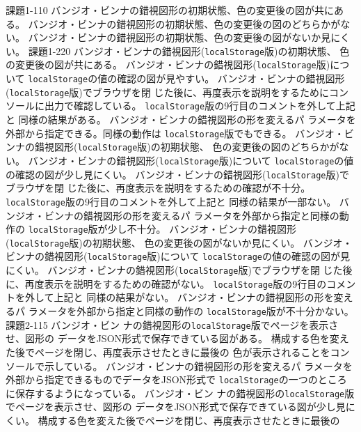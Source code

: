 \documentclass[a4j]{jreport}
\begin{document}
{
{課題1-1}{10}
{
  {バンジオ・ビンナの錯視図形の初期状態、色の変更後の図が共にある。}
}
{
  {バンジオ・ビンナの錯視図形の初期状態、色の変更後の図のどちらかがない。}
}
{
  {バンジオ・ビンナの錯視図形の初期状態、色の変更後の図がないか見にくい。}
}
{\ResultA}
{課題1-2}{20}
{
  {バンジオ・ビンナの錯視図形(\texttt{{localStorage}}版)の初期状態、
  色の変更後の図が共にある。}
  {バンジオ・ビンナの錯視図形(\texttt{localStorage}版)について
  \texttt{localStorage}の値の確認の図が見やすい。}
  {バンジオ・ビンナの錯視図形(\texttt{localStorage}版)でブラウザを閉
  じた後に、再度表示を説明をするためにコンソールに出力で確認している。}
	{\texttt{localStorage}版の9行目のコメントを外して上記と
				同様の結果がある。}
	{バンジオ・ビンナの錯視図形の形を変えるパ
				ラメータを外部から指定できる。同様の動作は
				\texttt{localStorage}版でもできる。}
}
{
  {バンジオ・ビンナの錯視図形(\texttt{{localStorage}}版)の初期状態、
  色の変更後の図のどちらかがない。}
  {バンジオ・ビンナの錯視図形(\texttt{localStorage}版)について
  \texttt{localStorage}の値の確認の図が少し見にくい。}
  {バンジオ・ビンナの錯視図形(\texttt{localStorage}版)でブラウザを閉
  じた後に、再度表示を説明をするための確認が不十分。}
	{\texttt{localStorage}版の9行目のコメントを外して上記と
				同様の結果が一部ない。}
	{バンジオ・ビンナの錯視図形の形を変えるパ
				ラメータを外部から指定と同様の動作の
				\texttt{localStorage}版が少し不十分。}
}
{
  {バンジオ・ビンナの錯視図形(\texttt{{localStorage}}版)の初期状態、
  色の変更後の図がないか見にくい。}
  {バンジオ・ビンナの錯視図形(\texttt{localStorage}版)について
  \texttt{localStorage}の値の確認の図が見にくい。}
  {バンジオ・ビンナの錯視図形(\texttt{localStorage}版)でブラウザを閉
  じた後に、再度表示を説明をするための確認がない。}
	{\texttt{localStorage}版の9行目のコメントを外して上記と
				同様の結果がない。}
	{バンジオ・ビンナの錯視図形の形を変えるパ
				ラメータを外部から指定と同様の動作の
				\texttt{localStorage}版が不十分かない。}
}
{\ResultA}
{課題2-1}{15}
{
	{バンジオ・ビン
				ナの錯視図形の\texttt{localStorage}版でページを表示させ、図形の
				データをJSON形式で保存できている図がある。}
	{構成する色を変えた後でページを閉じ、再度表示させたときに最後の
	色が表示されることをコンソールで示している。}
	{バンジオ・ビンナの錯視図形の形を変えるパ
				ラメータを外部から指定できるものでデータをJSON形式で
				\texttt{localStorage}の一つのところに保存するようになっている。}
}
{
	{バンジオ・ビン
				ナの錯視図形の\texttt{localStorage}版でページを表示させ、図形の
				データをJSON形式で保存できている図が少し見にくい。}
	{構成する色を変えた後でページを閉じ、再度表示させたときに最後の
}}}
\end{document}
